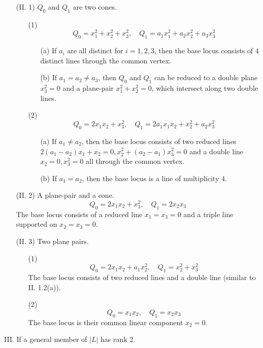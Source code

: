 \documentclass{amsart}[12pt]
\theoremstyle{definition}
\theoremstyle{remark}
\numberwithin{equation}{section}
\newcommand{\abs}[1]{\lvert#1\rvert}
\begin{document}
\begin{itemize}
\item[(II. 1)] $Q_0$ and $Q_1$ are two cones. 
\begin{enumerate}
\item[(1)] 
\[ 
Q_0 = x_1^2 + x_2^2 + x_3^2, \quad Q_1 = a_1x_1^2 + a_2x_2^2 + a_3x_3^2
\]
\begin{itemize}
\item[(a)] If $a_i$ are all distinct for $i = 1, 2, 3$, then the base locus consists of 4 distinct lines through the common vertex.
\item[(b)] If $a_1 = a_2 \neq a_3$, then $Q_0$ and $Q_1$ can be reduced to a double plane $x_3^2 = 0$ and a plane-pair $x_1^2 + x_2^2 = 0$, which intersect along two double lines.
\end{itemize}
\item[(2)] 
\[ 
Q_0 = 2x_1x_2 + x_3^2, \quad Q_1 = 2a_1x_1x_2 + x_2^2 + a_2x_3^2
\]
\begin{itemize}
\item[(a)] If $a_1 \neq a_2$, then the base locus consists of two reduced lines $2(a_1 - a_2)x_1 + x_2 = 0, x_2^2 + (a_2 - a_1)x_3^2 = 0$ and a double line $x_2 = 0, x_3^2 = 0$ all through the common vertex.
\item[(b)] If $a_1 = a_2$, then the base locus is a line of multiplicity 4.
\end{itemize}
\end{enumerate}

\item[(II. 2)] A plane-pair and a cone.
\[
Q_0 = 2x_1x_2 + x_3^2, \quad Q_1 = 2x_2x_3
\]
The base locus consists of a reduced line $x_1 = x_3 = 0$ and a triple line supported on $x_2 = x_3 = 0$.

\item[(II. 3)] Two plane pairs. 
\begin{enumerate}
\item[(1)] 
\[
Q_0 = 2x_1x_2 + a_1x_2^2, \quad Q_1 = x_2^2 + x_3^2
\]
The base locus consists of two reduced lines and a double line (similar to II. 1.2(a)).
\item[(2)]  
\[
Q_0 = x_1x_2, \quad Q_1 = x_2x_3
\]
The base locus is their common linear component $x_2 = 0$.
\end{enumerate}
\end{itemize}

III. If a general member of $\abs{L}$ has rank 2. 
\end{document}
